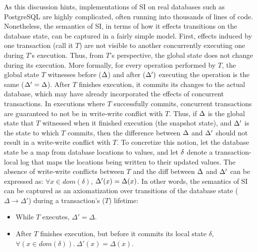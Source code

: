 As this discussion hints, implementations of SI on real databases
such as PostgreSQL are highly complicated, often running into
thousands of lines of code.  Nonetheless, the semantics of SI, in
terms of how it effects transitions on the database state, can be
captured in a fairly simple model. First, effects induced by one
transaction (call it $T$) are not visible to another concurrently executing one
during $T$'s execution. Thus, from $T$'s perspective,
the global state does not change during its execution.  More formally,
for every operation performed by $T$, the global state $T$ witnesses
before ($\Delta$) and after ($\Delta')$ executing the operation is the
same ($\Delta'=\Delta$).  After $T$ finishes execution, it commits its
changes to the actual database, which may have already incorporated
the effects of concurrent transactions. In executions where $T$
successfully commits, concurrent transactions are guaranteed to not be
in write-write conflict with $T$. Thus, if $\Delta$ is the global state
that $T$ witnessed when it finished execution (the snapshot state),
and $\Delta'$ is the state to which $T$ commits, then the difference
between $\Delta$ and $\Delta'$ should not result in a write-write conflict
with $T$. To concretize this notion, let the database state be a map
from database locations to values, and let $\delta$ denote a
transaction-local log that maps the locations being written to their
updated values.  The absence of write-write conflicts between $T$ and
the diff between $\Delta$ and $\Delta'$ can be expressed as: $\forall
x\in\mathit{dom}(\delta)$, $\Delta'(x) = \Delta(x)$.  In other words, the
semantics of SI can be captured as an axiomatization over transitions
of the database state ($\Delta \longrightarrow \Delta'$) during a
transaction's ($T$) lifetime:
\begin{itemize}
  \item While $T$ executes, $\Delta' = \Delta$.
  \item After $T$ finishes execution, but before it commits its local
    state $\delta$, $\forall(x\in\mathit{dom}(\delta)).~\Delta'(x) = \Delta(x)$.
\end{itemize}

